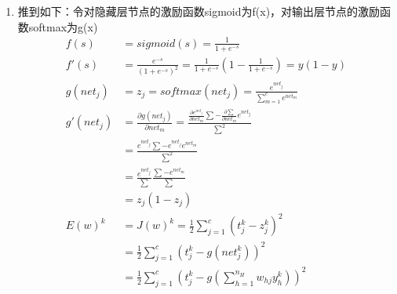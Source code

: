 \documentclass[a4paper,11pt,onecolumn,oneside,UTF8]{article}
\begin{document}
\begin{enumerate}
    \item
          推到如下：令对隐藏层节点的激励函数sigmoid为f(x)，对输出层节点的激励函数softmax为g(x)
          $$
              \begin{aligned}
                  f\left(s\right)      & =sigmoid\left(s\right)=\frac{1}{1+e^{-s}}                                                                                                                        \\
                  f'\left(s\right)     & =\frac{e^{-s}}{\left(1+e^{-s}\right)^2}=\frac{1}{1+e^{-s}}\left(1-\frac{1}{1+e^{-s}}\right)=y\left(1-y\right)                                                    \\
                  g\left(net_j\right)  & =z_j=softmax\left(net_j\right)=\frac{e^{net_j}}{\sum\limits_{m=1}^ce^{net_m}}                                                                                    \\
                  g'\left(net_j\right) & =\frac{\partial g\left(net_j\right)}{\partial net_m} =\frac{\frac{\partial e^{net_j}}{\partial net_m}\sum-\frac{\partial \sum}{\partial net_m}e^{net_j}}{\sum^2} \\
                                       & = \frac{e^{net_j}\sum-e^{net_j}e^{net_m}}{\sum^2}                                                                                                                \\
                                       & = \frac{e^{net_j}}{\sum}\frac{\sum-e^{net_m}}{\sum}                                                                                                              \\
                                       & =z_j\left(1-z_j\right)                                                                                                                                           \\
                  E\left(w\right)^k    & =J\left(w\right)^k=\frac{1}{2}\sum\limits_{j=1}^c\left(t_j^k-z_j^k\right)^2                                                                                      \\
                                       & =\frac{1}{2}\sum\limits_{j=1}^c\left(t_j^k-g\left(net_j^k\right)\right)^2                                                                                        \\
                                       & =\frac{1}{2}\sum\limits_{j=1}^c\left(t_j^k-g\left(\sum\limits_{h=1}^{n_H}w_{hj}y_h^k\right)\right)^2                                                             \\

\end{aligned}$$
\end{enumerate}
\end{document}
